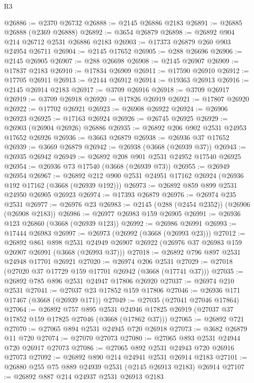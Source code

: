 \begin{lexlean}{R3}
\begin{coremodule}
@26886 := @2370 @26732
@26888 := @2145 @26886 @2183
@26891 := @26885 @26888 (@2369 @26888)
@26892 := @3654 @26879
@26898 := @26892 @904 @214 @26712 @2531 @26886 @2183
@26903 := @17373 @26879 @260 @903 @24954 @26711
@26904 := @2145 @17652
@26905 := @288 @26696
@26906 := @2145 @26905
@26907 := @288 @26698
@26908 := @2145 @26907
@26909 := @17837 @2183
@26910 := @17834 @26909
@26911 := @17590 @26910
@26912 := @17705 @26911
@26913 := @2144 @26912
@26914 := @19363 @26913
@26916 := @2145 @26914 @2183
@26917 := @3709 @26916
@26918 := @3709 @26917
@26919 := @3709 @26918
@26920 := @17826 @26919
@26921 := @17807 @26920
@26922 := @17702 @26921
@26923 := @26908 @26922
@26924 := @26906 @26923
@26925 := @17163 @26924
@26926 := @26745 @26925
@26929 := @26903 (@26904 @26926) @26886
@26935 := @26892 @206 @902 @2531 @24953 @17652 @26926
@26936 := @3663 @26879
@26938 := @26936 @37 @17652
@26939 := @3669 @26879
@26942 := @26938 (@3668 (@26939 @37))
@26943 := @26935 @26942
@26949 := @26892 @208 @901 @2531 @24952 @17540 @26925
@26954 := @26936 @73 @17540 (@3668 (@26939 @73))
@26955 := @26949 @26954
@26967 := @26892 @212 @900 @2531 @24951 @17162 @26924 (@26936 @192 @17162 (@3668 (@26939 @192)))
@26973 := @26892 @859 @899 @2531 @24950 @26905 @26923
@26974 := @17393 @26879
@26976 := @26974 @235 @2531
@26977 := @26976 @23
@26983 := @2145 (@288 (@2454 @2352)) (@26906 (@26908 @2183))
@26986 := @26977 @26983 @159 @26905
@26991 := @26936 @123 @26860 (@3668 (@26939 @123))
@26992 := @26986 @26991
@26993 := @17444 @26983
@26997 := @26973 (@26992 (@3668 (@26993 @23)))
@27012 := @26892
    @861
    @898
    @2531
    @24949
    @26907
    @26922
    (@26976 @37 @26983 @159 @26907 @26991 (@3668 (@26993 @37)))
@27018 := @26892 @796 @897 @2531 @24948 @17701 @26921
@27020 := @26974 @206 @2531
@27029 := @27018 (@27020 @37 @17729 @159 @17701 @26942 (@3668 (@17741 @37)))
@27035 := @26892 @785 @896 @2531 @24947 @17806 @26920
@27037 := @26974 @210 @2531
@27041 := @27037 @23 @17852 @159 @17806
@27046 := @26936 @171 @17467 (@3668 (@26939 @171))
@27049 := @27035 (@27041 @27046 @17864)
@27064 := @26892
    @757
    @895
    @2531
    @24946
    @17825
    @26919
    (@27037 @37 @17852 @159 @17825 @27046 (@3668 (@17862 @37)))
@27065 := @26892 @721
@27070 := @27065 @894 @2531 @24945 @720 @26918
@27073 := @3682 @26879 @11 @720
@27074 := @27070 @27073
@27080 := @27065 @893 @2531 @24944 @720 @26917 @27073
@27086 := @27065 @892 @2531 @24943 @720 @26916 @27073
@27092 := @26892 @890 @214 @24941 @2531 @26914 @2183
@27101 := @26880 @255 @75 @889 @24939 @2531 (@2145 @26913 @2183) @26914
@27107 := @26892 @887 @214 @24937 @2531 @26913 @2183

\end{coremodule}
\end{lexlean}
